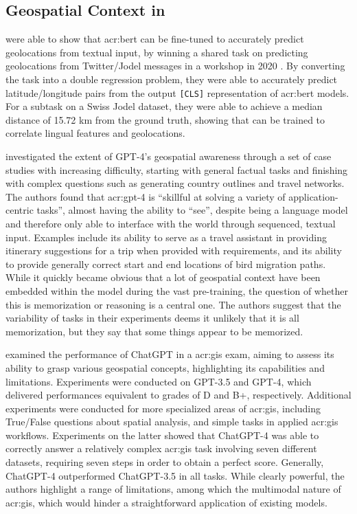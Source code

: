 \subsection[Geospatial Context in LLMs]{Geospatial Context in }\label{subsec:geospatial-context}

\cite{scherrerHeLjuVarDial20202020} were able to show that \acrshort{acr:bert} can be fine-tuned to accurately predict geolocations from textual input, by winning a shared task on predicting geolocations from Twitter/Jodel messages in a workshop in 2020 \citep{gamanReportVarDialEvaluation2020}. By converting the task into a double regression problem, they were able to accurately predict latitude/longitude pairs from the output \texttt{[CLS]} representation of \acrshort{acr:bert} models. For a subtask on a Swiss Jodel dataset, they were able to achieve a median distance of 15.72 km from the ground truth, showing that  can be trained to correlate lingual features and geolocations.

\cite{robertsGPT4GEOHowLanguage2023} investigated the extent of GPT-4's geospatial awareness through a set of case studies with increasing difficulty, starting with general factual tasks and finishing with complex questions such as generating country outlines and travel networks. The authors found that \acrshort{acr:gpt}-4 is \enquote{skillful at solving a variety of application-centric tasks}, almost having the ability to \enquote{see}, despite being a language model and therefore only able to interface with the world through sequenced, textual input. Examples include its ability to serve as a travel assistant in providing itinerary suggestions for a trip when provided with requirements, and its ability to provide generally correct start and end locations of bird migration paths. While it quickly became obvious that a lot of geospatial context have been embedded within the model during the vast pre-training, the question of whether this is memorization or reasoning is a central one. The authors suggest that the variability of tasks in their experiments deems it unlikely that it is all memorization, but they say that some things appear to be memorized.

\cite{mooneyUnderstandingGeospatialSkills2023} examined the performance of ChatGPT in a \acrfull{acr:gis} exam, aiming to assess its ability to grasp various geospatial concepts, highlighting its capabilities and limitations. Experiments were conducted on GPT-3.5 and GPT-4, which delivered performances equivalent to grades of D and B+, respectively. Additional experiments were conducted for more specialized areas of \acrshort{acr:gis}, including True/False questions about spatial analysis, and simple tasks in applied \acrshort{acr:gis} workflows. Experiments on the latter showed that ChatGPT-4 was able to correctly answer a relatively complex \acrshort{acr:gis} task involving seven different datasets, requiring seven steps in order to obtain a perfect score. Generally, ChatGPT-4 outperformed ChatGPT-3.5 in all tasks. While clearly powerful, the authors highlight a range of limitations, among which the multimodal nature of \acrshort{acr:gis}, which would hinder a straightforward application of existing models.


